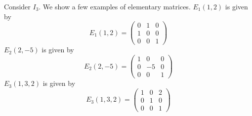 \begin{Example}
    Consider $I_3$. We show a few examples of elementary matrices.
    $E_1(1,2)$ is given by
    \begin{equation*}
	E_1(1,2) = 
	\begin{pmatrix} 
	    0 & 1 & 0 \\
	    1 & 0 & 0 \\
	    0 & 0 & 1
	\end{pmatrix}
    \end{equation*}
    $E_2(2,-5)$ is given by
    \begin{equation*}
	E_2(2,-5) = 
	\begin{pmatrix} 
	    1 & 0 & 0 \\
	    0 & -5 & 0 \\
	    0 & 0 & 1
	\end{pmatrix}
    \end{equation*}
    $E_3(1,3,2)$ is given by
    \begin{equation*}
	E_3(1,3,2) = 
	\begin{pmatrix} 
	    1 & 0 & 2 \\
	    0 & 1 & 0 \\
	    0 & 0 & 1
	\end{pmatrix}
    \end{equation*}
\end{Example}

